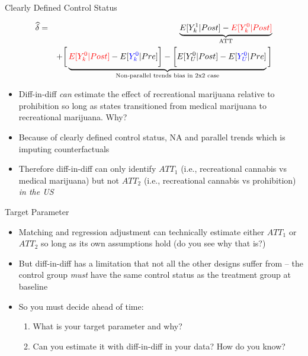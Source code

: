 \documentclass{beamer}
\begin{document}
\begin{frame}{Clearly Defined Control Status}

\begin{eqnarray*}
\widehat{\delta} &=& \underbrace{E[Y^1_k | Post] - \textcolor{red}{E[Y^0_k | Post]}}_{\mathclap{\text{ATT}}} \\
&& + \bigg [  \underbrace{\textcolor{red}{E[Y^0_k | Post]} - E[\textcolor{blue}{Y^0_k} | Pre] \bigg ] - \bigg [ E[Y^0_U | Post] - E[\textcolor{blue}{Y_U^0} | Pre] }_{\mathclap{\text{Non-parallel trends bias in 2x2 case}}} \bigg ]
\end{eqnarray*}

\begin{itemize}
\item Diff-in-diff \emph{can} estimate the effect of recreational marijuana relative to prohibition so long as states transitioned from medical marijuana to recreational marijuana.  Why?
\pause
\item Because of clearly defined control status, NA and parallel trends which is imputing counterfactuals
\pause
\item Therefore diff-in-diff can only identify $ATT_1$ (i.e., recreational cannabis vs medical marijuana) but not $ATT_2$ (i.e., recreational cannabis vs prohibition) \emph{in the US}
\end{itemize}

\end{frame}


\begin{frame}{Target Parameter}

\begin{itemize}
\item Matching and regression adjustment can technically estimate either $ATT_1$ or $ATT_2$ so long as its own assumptions hold (do you see why that is?)
\item But diff-in-diff has a limitation that not all the other designs suffer from -- the control group \emph{must} have the same control status as the treatment group at baseline
\item So you must decide ahead of time:
	\begin{enumerate}
	\item What is your target parameter and why?
	\item Can you estimate it with diff-in-diff in your data?  How do you know?
	\end{enumerate}
\end{itemize}

\end{frame}
\end{document}
